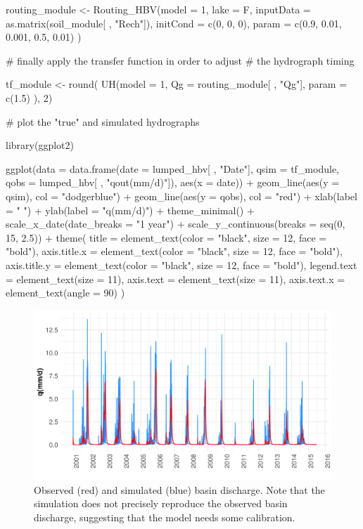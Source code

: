 \begin{example}
routing_module <-
  Routing_HBV(model = 1, 
              lake = F, 
              inputData = as.matrix(soil_module[ , "Rech"]),
              initCond = c(0, 0, 0), 
              param = c(0.9, 0.01, 0.001, 0.5, 0.01) )
              
# finally apply the transfer function in order to adjust 
# the hydrograph timing 

tf_module <-
  round( 
    UH(model = 1,
       Qg = routing_module[ , "Qg"],
       param = c(1.5) ),
    2)
    
# plot the "true" and simulated hydrographs

library(ggplot2)

ggplot(data = data.frame(date = lumped_hbv[ , "Date"],
                         qsim = tf_module,
                         qobs = lumped_hbv[ , "qout(mm/d)"]),
       aes(x = date)) +
  geom_line(aes(y = qsim), col = "dodgerblue") +
  geom_line(aes(y = qobs), col = "red") +
  xlab(label = " ") + ylab(label = "q(mm/d)") +
  theme_minimal() +
  scale_x_date(date_breaks = "1 year") +
  scale_y_continuous(breaks = seq(0, 15, 2.5)) +
  theme(
    title = element_text(color = "black", size = 12, face = "bold"),
    axis.title.x = element_text(color = "black", size = 12, face = "bold"),
    axis.title.y = element_text(color = "black", size = 12, face = "bold"),
    legend.text = element_text(size = 11),
    axis.text = element_text(size = 11),
    axis.text.x = element_text(angle = 90) )
\end{example}

\begin{figure}[htbp]
  \centering
  \includegraphics[scale = 0.8]{lumped_model}
  \caption{Observed (red) and simulated (blue) basin discharge. Note that the simulation does not precisely 
  reproduce the observed basin discharge, suggesting that the model needs some calibration.}
  \label{fig:lumped_model}
\end{figure}

